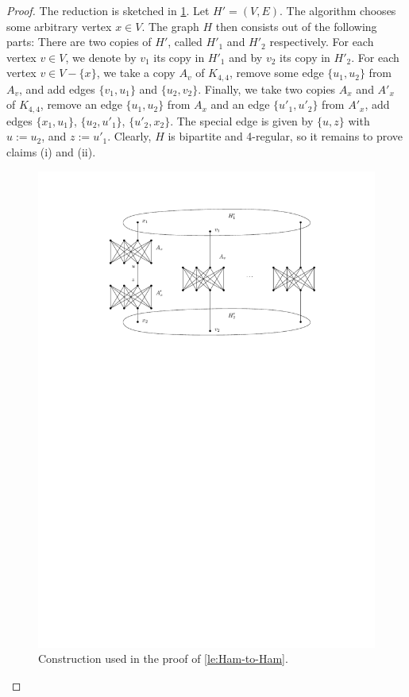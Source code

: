 \documentclass[runningheads]{llncs}
\newcommand{\set}[1]{\{ #1 \}}
\newcommand{\lasse}[1]{#1}
\begin{document}
\begin{proof}
\lasse{
The reduction is sketched in \cref{fig_hamilton_cycle_lemma}. Let $H' = (V, E)$. The algorithm chooses some arbitrary vertex $x \in V$. The graph $H$ then consists out of the following parts: There are two copies of $H'$, called $H'_1$ and $H'_2$ respectively. For each vertex $v \in V$, we denote by $v_1$ its copy in $H'_1$ and by $v_2$ its copy in $H'_2$. For each vertex $v \in V-\set{x}$, we take a copy $A_v$ of $K_{4,4}$, remove some edge $\set{u_1, u_2}$ from $A_v$, and add edges $\set{v_1,u_1}$ and $\set{u_2,v_2}$. Finally, we take two copies $A_x$ and $A'_x$ of $K_{4,4}$, remove an edge $\set{u_1,u_2}$ from $A_x$ and an edge $\set{u'_1,u'_2}$ from $A'_x$, add edges $\set{x_1,u_1}$, $\set{u_2,u'_1}$, $\set{u'_2,x_2}$. The special edge is given by $\set{u, z}$ with $u := u_2$, and $z := u'_1$. Clearly, $H$ is bipartite and 4-regular, so it remains to prove claims (i) and (ii).
}
\begin{figure}[htpb]
\centering
\includegraphics[scale=0.92]{hamilton-prime}
\caption{\lasse{Construction used in the proof of \cref{le:Ham-to-Ham}.}}
\label{fig_hamilton_cycle_lemma}
\end{figure}


\end{proof}
\end{document}
